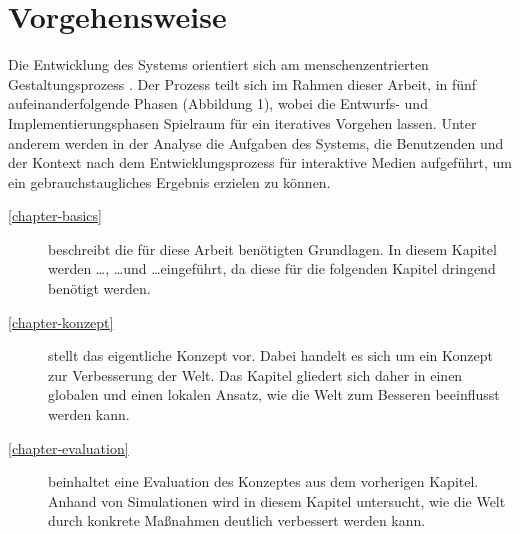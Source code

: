 \section{Vorgehensweise}
Die Entwicklung des Systems orientiert sich am menschenzentrierten Gestaltungsprozess \cite{din_en_iso_9421-2102020-03_din_nodate}. Der Prozess teilt sich im Rahmen dieser Arbeit, in fünf aufeinanderfolgende
Phasen (Abbildung 1), wobei die Entwurfs- und Implementierungsphasen Spielraum für ein iteratives
Vorgehen lassen. Unter anderem werden in der Analyse die Aufgaben des Systems, die Benutzenden
und der Kontext nach dem Entwicklungsprozess für interaktive Medien \cite{herczeg_einfuhrung_2009} aufgeführt,
um ein gebrauchstaugliches Ergebnis erzielen zu können.
\begin{description}
  \item[\ref{chapter-basics}] beschreibt die für diese Arbeit benötigten Grundlagen. In diesem Kapitel werden \ldots, \ldots und \ldots eingeführt, da diese für die folgenden Kapitel dringend benötigt werden.
  \item[\ref{chapter-konzept}] stellt das eigentliche Konzept vor. Dabei handelt es sich um ein Konzept zur Verbesserung der Welt. Das Kapitel gliedert sich daher in einen globalen und einen lokalen Ansatz, wie die Welt zum Besseren beeinflusst werden kann.
  \item[\ref{chapter-evaluation}] beinhaltet eine Evaluation des Konzeptes aus dem vorherigen Kapitel. Anhand von Simulationen wird in diesem Kapitel untersucht, wie die Welt durch konkrete Maßnahmen deutlich verbessert werden kann.
\end{description}

